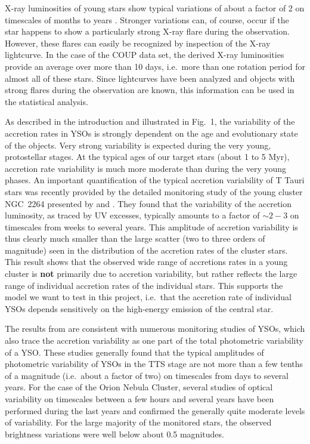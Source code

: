 \documentclass[10pt,fleqn,twoside]{article}
\begin{document}
\smallskip


X-ray luminosities of young stars show typical variations of about
a factor of 2 on timescales of months to years \citep[e.g.][]{Wolk04}.
Stronger variations can, of course,  occur if the star happens to show a
particularly strong X-ray flare during the observation. However,
these flares can easily be recognized by inspection of
the X-ray lightcurve.
%
In the case of the COUP data set, the derived X-ray luminosities
provide an average over more than 10 days, i.e.~more than one
rotation period for almost all of these stars.
Since lightcurves have been analyzed and objects with strong
flares during the observation are known, this information can
be used in the statistical analysis.

\medskip

As described in the introduction and illustrated in Fig.~1,
the variability of the accretion rates in YSOs is strongly dependent
on the age and evolutionary state of the objects.
Very strong variability is expected during the very young, protostellar stages.
%
At the typical ages of our target stars (about 1 to 5 Myr),
accretion rate variability is much more moderate than during the
very young phases.
%
An important quantification of the typical accretion variability of T Tauri stars
was recently
provided by the detailed monitoring study of the young cluster NGC~2264
presented by \citet{Venuti14} and \citet{Venuti15}.
 They found that the variability of the accretion luminosity, as traced
by UV excesses, 
typically amounts to a factor of $\sim 2-3$ on timescales
from weeks to several years. This amplitude of accretion variability
is thus clearly much smaller than the large scatter 
(two to three orders of magnitude)
seen in the distribution of the accretion rates of the cluster stars.
This result shows that the observed wide range of accretions rates
in a young cluster is \textbf{not} primarily due to accretion variability, 
but rather reflects the large range of individual accretion rates of 
the individual stars.
This supports the model we want to test in this project, i.e.~that 
the accretion rate of individual YSOs depends sensitively on the high-energy 
emission of the central  star.

The results from \citet{Venuti14} are consistent with numerous monitoring
studies of YSOs, which also trace the accretion variability as one part
of the total photometric variability of a YSO.
%
%
These studies generally found that the typical
amplitudes of photometric variability of YSOs in the TTS stage
are not more than a few tenths of a magnitude (i.e.~about a factor of two)
on timescales from days to several years.
For the case of the Orion Nebula Cluster, several studies of 
optical variability
on timescales between a few hours and several years
have been performed during the last years
\citep{Herbst02,Stassun06,Stassun07,Parihar09,Rice15} and confirmed
the generally quite moderate levels of variability.
For the large majority of the monitored stars, the observed brightness 
variations were well below about 0.5 magnitudes.
\end{document}
